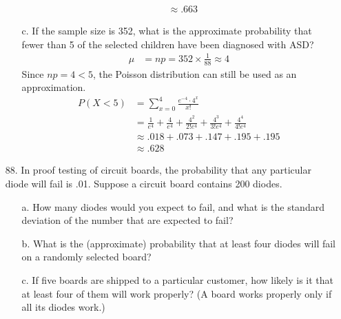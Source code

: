 \documentclass[letterpaper,12pt]{article}
\newcommand{\poisson}[2]{%
  \frac{e^{-#2} \cdot #2^{#1}}{#1!}%
}
\newcommand{\poissonsum}[3]{%
  \sum_{x = #1}^{#2} \poisson{x}{#3}%
}
\begin{document}
\begin{enumerate}
\begin{enumerate}
\begin{align*}
          &\approx .663
        \end{align*}
      \item[c.]
        If the sample size is 352, what is the approximate probability that fewer than 5 of the selected children have been diagnosed with ASD?
        \begin{align*}
          \mu &= np = 352 \times \frac{1}{88} \approx 4
        \end{align*}
        Since $np = 4 < 5$, the Poisson distribution can still be used as an approximation.
        \begin{align*}
          P(X < 5) &= \poissonsum{0}{4}{4} \\
          &= \frac{1}{e^4} + \frac{4}{e^4} + \frac{4^2}{2!e^4} + \frac{4^3}{3!e^4} + \frac{4^4}{4!e^4} \\
          &\approx .018 + .073 + .147 + .195 + .195 \\
          &\approx .628
        \end{align*}
    \end{enumerate}
  \item[88.]
    In proof testing of circuit boards, the probability that any particular diode will fail is .01. Suppose a circuit board contains 200 diodes.
    \begin{enumerate}
      \item[a.]
        How many diodes would you expect to fail, and what is the standard deviation of the number that are expected to fail?
      \item[b.]
        What is the (approximate) probability that at least four diodes will fail on a randomly selected board?
      \item[c.]
        If five boards are shipped to a particular customer, how likely is it that at least four of them will work properly? (A board works properly only if all its diodes work.)
    \end{enumerate}
\end{enumerate}
\end{document}
